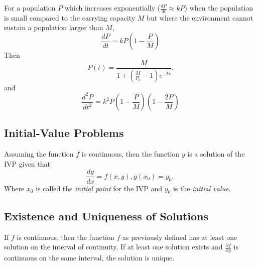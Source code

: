 \begin{definition} For a population $P$ which increases exponentially ($\frac{dP}{dt} \approx kP$) when the population is small compared to the carrying capacity $M$ but where the environment cannot sustain a population larger than $M$,
  \[
    \frac{dP}{dt} = kP \left(1 - \frac{P}{M}\right)
  \]
  Then
  \[
    P(t) = \frac{M}{1 + \left(\frac{M}{P_0} - 1\right)e^{-kt}}.
  \]
  and
  \[
    \frac{d^2P}{dt^2} = k^2P \left(1 - \frac{P}{M}\right) \left(1 - \frac{2P}{M}\right)
  \]
\end{definition}

\subsection{Initial-Value Problems}

\begin{definition}
    Assuming the function $f$ is continuous, then the function $y$ is a solution of the IVP given that
    \[
        \frac{dy}{dx} = f(x,y), y(x_0) = y_0,
    \]
    Where $x_0$ is called the \textit{initial point} for the IVP and $y_0$ is the \textit{initial value}.
\end{definition}

\subsection{Existence and Uniqueness of Solutions}

\begin{theorem}
    If $f$ is continuous, then the function $f$ as previously defined has at least one solution on the interval of continuity. If at least one solution exists and $\frac{\partial^{}f}{\partial^{}y}$ is continuous on the same interval, the solution is unique.
\end{theorem}
